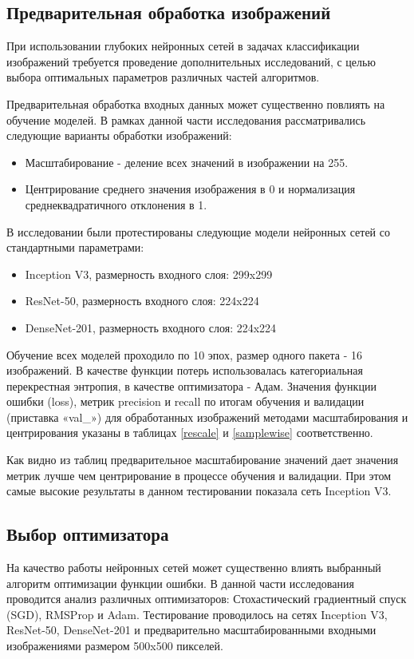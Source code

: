 \subsection{Предварительная обработка изображений}

При использовании глубоких нейронных сетей в задачах классификации изображений требуется проведение дополнительных исследований, с целью выбора оптимальных параметров различных частей алгоритмов. 

Предварительная обработка входных данных может существенно повлиять на обучение моделей. В рамках данной части исследования рассматривались следующие варианты обработки изображений:
\begin{itemize}    
    \item Масштабирование - деление всех значений в изображении на 255.
    \item Центрирование среднего значения изображения в 0 и нормализация среднеквадратичного отклонения в 1.
\end{itemize}
В исследовании были протестированы следующие модели нейронных сетей со стандартными параметрами:
\begin{itemize}
    \item Inception V3, размерность входного слоя: 299x299
    \item ResNet-50, размерность входного слоя: 224x224
    \item DenseNet-201, размерность входного слоя:  224x224
\end{itemize} 
Обучение всех моделей проходило по 10 эпох, размер одного пакета - 16 изображений. В качестве функции потерь использовалась категориальная перекрестная энтропия, в качестве оптимизатора - Адам. 
Значения функции ошибки (loss), метрик precision и recall  по итогам обучения и валидации (приставка «val\_») для обработанных изображений методами масштабирования и центрирования указаны в таблицах \ref{rescale} и \ref{samplewise} соответственно. 



Как видно из таблиц предварительное масштабирование значений дает значения метрик лучше чем центрирование в процессе обучения и валидации. При этом самые высокие результаты в данном тестировании показала сеть Inception V3.

\subsection{Выбор оптимизатора}
На качество работы нейронных сетей может существенно влиять выбранный алгоритм оптимизации функции ошибки. В данной части исследования проводится анализ различных оптимизаторов: Стохастический градиентный спуск (SGD), RMSProp и Adam. Тестирование проводилось на сетях Inception V3, ResNet-50, DenseNet-201 и предварительно масштабированными входными изображениями размером 500x500 пикселей.  

